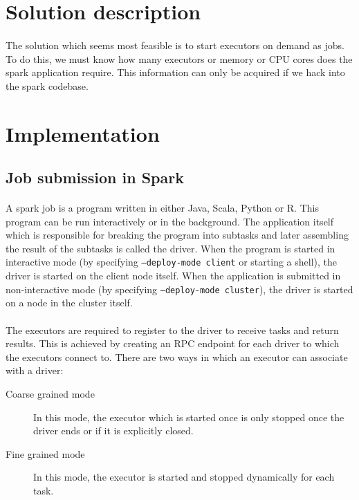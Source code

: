 \section{Solution description}

\paragraph{}
The solution which seems most feasible is to start \glspl{executor} on
demand as  jobs. To do this, we must know how many executors or
memory or CPU cores does the spark application require. This information can
only be acquired if we hack into the \gls{spark} codebase.


\section{Implementation}

\subsection{Job submission in Spark}
\paragraph{}
A \gls{spark} job is a program written in either Java, Scala, Python or R. This
program can be run interactively or in the background. The application itself
which is responsible for breaking the program into subtasks and later assembling
the result of the subtasks is called the \gls{driver}. When the program is
started in interactive mode (by specifying \texttt{--deploy-mode client} or
starting a shell), the driver is started on the client node itself. When the
application is submitted in non-interactive mode (by specifying
\texttt{--deploy-mode cluster}), the driver is started on a node in the cluster
itself.

\paragraph{}
The \glspl{executor} are required to register to the \gls{driver} to
receive tasks and return results. This is achieved by creating an RPC endpoint
for each \gls{driver} to which the \glspl{executor} connect to. There are
two ways in which an \gls{executor} can associate with a
\gls{driver}:
\begin{description}
    \item[Coarse grained mode] In this mode, the \gls{executor} which is started
        once is only stopped once the \gls{driver} ends or if it is explicitly
        closed.
    \item[Fine grained mode] In this mode, the \gls{executor} is started and
        stopped dynamically for each task.
\end{description}

